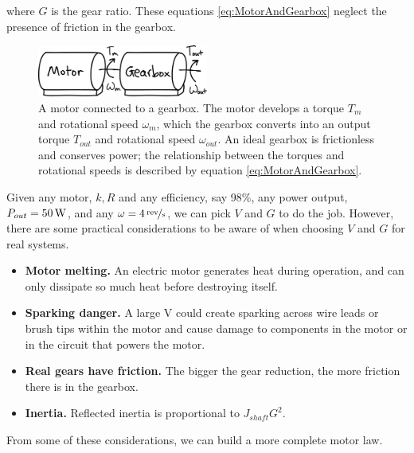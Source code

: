 where $G$ is the gear ratio. These equations \ref{eq:MotorAndGearbox} neglect the presence of friction in the gearbox.

\begin{figure}[h]		%
\begin{centering}
\includegraphics[width=0.5\textwidth]{Figures/MotorAndGearbox}\par
\end{centering}
\caption[Diagram: Motor Connected to a Gearbox]{A motor connected to a gearbox. The motor develops a torque $T_{m}$ and rotational speed $\omega_{m}$, which the gearbox converts into an output torque $T_{out}$ and rotational speed $\omega_{out}$. An ideal gearbox is frictionless and conserves power; the relationship between the torques and rotational speeds is described by equation \ref{eq:MotorAndGearbox}.}
\label{fig:MotorAndGearbox}
\end{figure}
%

Given any motor, $k, R$ and any efficiency, say 98\%, any power output, $P_{out}=\unit[50]{W}$, and any $\omega=\unitfrac[4]{rev}{s}$, we can pick $V$ and $G$ to do the job. However, there are some practical considerations to be aware of when choosing $V$ and $G$ for real systems.  

\begin{itemize}

\item \textbf{Motor melting.} An electric motor generates heat during operation, and can only dissipate so much heat before destroying itself.
\item \textbf{Sparking danger.} A large V could create sparking across wire leads or brush tips within the motor and cause damage to components in the motor or in the circuit that powers the motor.
\item \textbf{Real gears have friction.} The bigger the gear reduction, the more friction there is in the gearbox.
\item \textbf{Inertia.} Reflected inertia is proportional to $J_{shaft}G^{2}$.

\end{itemize}

From some of these considerations, we can build a more complete motor law.

